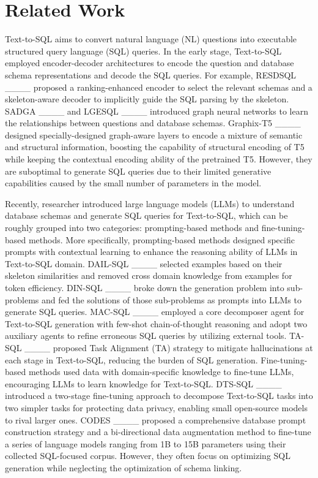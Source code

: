 \section{Related Work}
\label{sec2}
Text-to-SQL aims to convert natural language (NL) questions into executable structured query language (SQL) queries. In the early stage, Text-to-SQL employed encoder-decoder architectures to encode the question and database schema representations and decode the SQL queries. For example, RESDSQL ____ proposed a ranking-enhanced encoder to select the relevant schemas and a skeleton-aware decoder to implicitly guide the SQL parsing by the skeleton. SADGA ____ and LGESQL ____ introduced graph neural networks to learn the relationships between questions and database schemas. Graphix-T5 ____ designed specially-designed graph-aware layers to encode a mixture of semantic and structural information, boosting the capability of structural encoding of T5 while keeping the contextual encoding ability of the pretrained T5. However, they are suboptimal to generate SQL queries due to their limited generative capabilities caused by the small number of parameters in the model.

Recently, researcher introduced large language models (LLMs) to understand database schemas and generate SQL queries for Text-to-SQL, which can be roughly grouped into two categories: prompting-based methods and fine-tuning-based methods. More specifically, prompting-based methods designed specific prompts with contextual learning to enhance the reasoning ability of LLMs in Text-to-SQL domain. DAIL-SQL ____ selected examples based on their skeleton similarities and removed cross domain knowledge from examples for token efficiency. DIN-SQL ____ broke down the generation problem into sub-problems and fed the solutions of those sub-problems as prompts into LLMs to generate SQL queries. MAC-SQL ____ employed a core decomposer agent for Text-to-SQL generation with few-shot chain-of-thought reasoning and adopt two auxiliary agents to refine erroneous SQL queries by utilizing external tools. TA-SQL ____ proposed Task Alignment (TA) strategy to mitigate hallucinations at each stage in Text-to-SQL, reducing the burden of SQL generation. Fine-tuning-based methods used data with domain-specific knowledge to fine-tune LLMs, encouraging LLMs to learn knowledge for Text-to-SQL. DTS-SQL ____ introduced a two-stage fine-tuning approach to decompose Text-to-SQL tasks into two simpler tasks for protecting data privacy, enabling small open-source models to rival larger ones. CODES ____ proposed a comprehensive database prompt construction strategy and a bi-directional data augmentation method to fine-tune a series of language models ranging from 1B to 15B parameters using their collected SQL-focused corpus. However, they often focus on optimizing SQL generation while neglecting the optimization of schema linking.